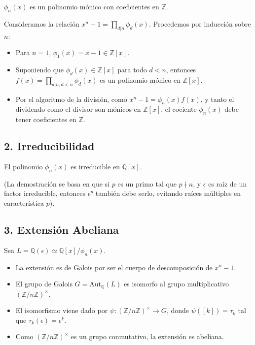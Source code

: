 \begin{itemize}
\begin{prop}
$\phi_n(x)$ es un polinomio mónico con coeficientes en $\mathbb{Z}$.
\end{prop}
\begin{dem}
Consideramos la relación $x^n - 1 = \prod_{d|n} \phi_d(x)$. Procedemos por inducción sobre $n$:
\begin{itemize}
    \item Para $n=1$, $\phi_1(x) = x-1 \in \mathbb{Z}[x]$.
    \item Suponiendo que $\phi_d(x) \in \mathbb{Z}[x]$ para todo $d < n$, entonces $f(x) = \prod_{d|n, d < n} \phi_d(x)$ es un polinomio mónico en $\mathbb{Z}[x]$.
    \item Por el algoritmo de la división, como $x^n - 1 = \phi_n(x) f(x)$, y tanto el dividendo como el divisor son mónicos en $\mathbb{Z}[x]$, el cociente $\phi_n(x)$ debe tener coeficientes en $\mathbb{Z}$.
\end{itemize}
\end{dem}

\subsection*{2. Irreducibilidad}
\begin{teo}
El polinomio $\phi_n(x)$ es irreducible en $\mathbb{Q}[x]$.
\end{teo}
(La demostración se basa en que si $p$ es un primo tal que $p \nmid n$, y $\epsilon$ es raíz de un factor irreducible, entonces $\epsilon^p$ también debe serlo, evitando raíces múltiples en característica $p$).

\subsection*{3. Extensión Abeliana}
Sea $L = \mathbb{Q}(\epsilon) \simeq \mathbb{Q}[x]/\phi_n(x)$. 
\begin{itemize}
    \item La extensión es de Galois por ser el cuerpo de descomposición de $x^n-1$.
    \item El grupo de Galois $G = \text{Aut}_{\mathbb{Q}}(L)$ es isomorfo al grupo multiplicativo $(\mathbb{Z}/n\mathbb{Z})^\times$.
    \item El isomorfismo viene dado por $\psi: (\mathbb{Z}/n\mathbb{Z})^\times \to G$, donde $\psi([k]) = \tau_k$ tal que $\tau_k(\epsilon) = \epsilon^k$.
    \item Como $(\mathbb{Z}/n\mathbb{Z})^\times$ es un grupo conmutativo, la extensión es abeliana.
\end{itemize}
\end{itemize}
